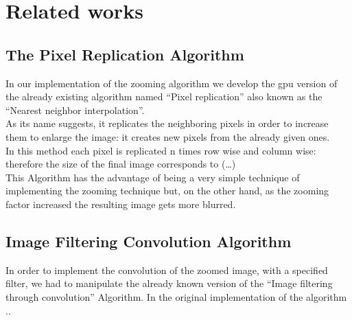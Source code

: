 \section{Related works}

    \subsection{The Pixel Replication Algorithm}
    In our implementation of the zooming algorithm we develop the gpu version of the already existing algorithm 
    named “Pixel replication” also known as the “Nearest neighbor interpolation”.\\
    As its name suggests, it replicates the neighboring pixels in order to increase them to enlarge the image: it creates new pixels from the already given ones.\\
    In this method each pixel is replicated n times row wise and column wise: therefore the size of the final image corresponds to (…) \\
    This Algorithm has the advantage of being a very simple technique of implementing the zooming technique but, 
    on the other hand, as the zooming factor increased the resulting image gets more blurred.

    \subsection{Image Filtering Convolution Algorithm}
    In order to implement the convolution of the zoomed image, with a specified filter, 
    we had to manipulate the already known version of the “Image filtering through convolution” Algorithm.
    In the original implementation of the algorithm ..